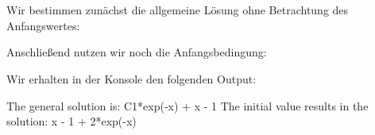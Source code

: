 \section{}

Wir bestimmen zunächst die allgemeine Lösung ohne Betrachtung des Anfangswertes:



Anschließend nutzen wir noch die Anfangsbedingung:



Wir erhalten in der Konsole den folgenden Output:

\begin{consoleoutput}
The general solution is: C1*exp(-x) + x - 1
The initial value results in the solution: x - 1 + 2*exp(-x)
\end{consoleoutput}
